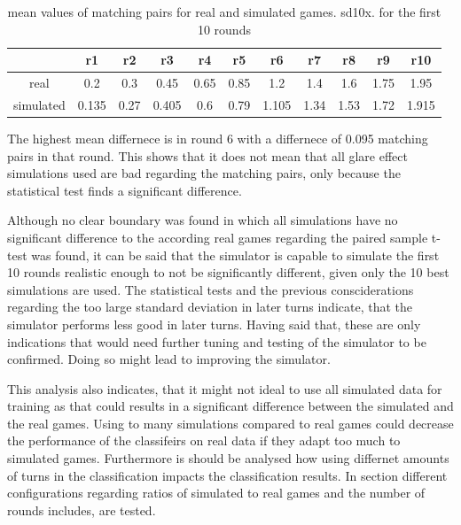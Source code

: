\begin{table}[H]
	\centering
	\caption{mean values of matching pairs for real and simulated games. sd10x. for the first 10 rounds}%
	\begin{tabular}{|c|c|c|c|c|c|c|c|c|c|c|}
		\hline
		& r1   &  r2  & r3 & r4   &  r5  & r6& r7   &  r8  & r9	&	r10\\
		\hline
	 	real&0.2 &0.3	&  0.45  &  0.65   &0.85 &  1.2   &    1.4 & 1.6 &  1.75 &1.95	\\
	 	\hline
	 	simulated&0.135 &0.27 &	0.405 &0.6  & 0.79 & 1.105& 1.34 & 1.53 & 1.72 & 1.915		\\
		\hline
	\end{tabular}
\end{table}

The highest mean differnece is in round 6 with a differnece of 0.095 matching pairs in that round. This shows that it does not mean that all glare effect simulations used are bad regarding the matching pairs, only because the statistical test finds a significant difference. 

Although no clear boundary was found in which all simulations have no significant difference to the according real games regarding the paired sample t-test was found, it can be said that the simulator is capable to simulate the first 10 rounds realistic enough to not be significantly different, given only the 10 best simulations are used.  The statistical tests and the previous consciderations regarding the too large standard deviation in later turns indicate, that the simulator performs less good in later turns. Having said that, these are only indications that would need further tuning and testing of the simulator to be confirmed. Doing so might lead to improving the simulator. 

This analysis also indicates, that it might not ideal to use all simulated data for training as that could results in a significant difference between the simulated and the real games. Using to many simulations compared to real games could decrease the performance of the classifeirs on real data if they adapt too much to simulated games. Furthermore is should be analysed how using differnet amounts of turns in the classification impacts the classification results. In section  different configurations regarding ratios of simulated to real games and the number of rounds includes, are tested. 

